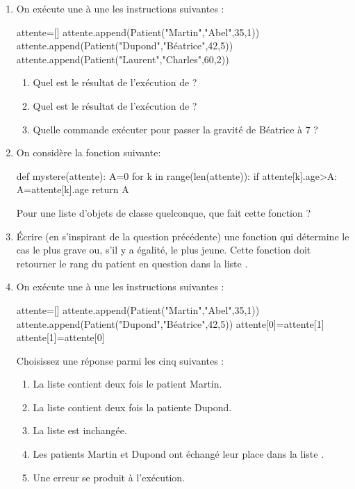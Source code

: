 \documentclass[11pt,a4paper,french,twoside]{PMCours}
\begin{document}
\begin{enumerate}
    \item On exécute une à une les instructions suivantes :
\begin{Python}
attente=[]
attente.append(Patient("Martin","Abel",35,1))
attente.append(Patient("Dupond","Béatrice",42,5))
attente.append(Patient("Laurent","Charles",60,2))
\end{Python}
\begin{enumerate}
    \item Quel est le résultat de l'exécution de  ?
    \item Quel est le résultat de l'exécution de  ?
    \item Quelle commande exécuter pour passer la gravité de Béatrice à $7$ ?
\end{enumerate}    
    \item On considère la fonction suivante:
\begin{Python}
def mystere(attente):
    A=0
    for k in range(len(attente)):
        if attente[k].age>A:
            A=attente[k].age
    return A
\end{Python}
    Pour une liste  d'objets de classe  quelconque,
    que fait cette fonction ?
    \item Écrire (en s'inspirant de la question précédente) une fonction  qui détermine
    le cas le plus grave ou, s'il y a égalité, le plus jeune.
    Cette fonction doit retourner le rang du patient en question dans la liste 
    .
    \item On exécute une à une les instructions suivantes :
\begin{Python}
attente=[]
attente.append(Patient("Martin","Abel",35,1))
attente.append(Patient("Dupond","Béatrice",42,5))
attente[0]=attente[1]
attente[1]=attente[0]
\end{Python}
    Choisissez une réponse parmi les cinq suivantes :
    \begin{enumerate}
        \item La liste  contient deux fois le patient Martin. 
        \item La liste  contient deux fois la patiente Dupond. 
        \item La liste  est inchangée. 
        \item Les patients Martin et Dupond ont échangé leur place dans la liste . 
        \item Une erreur se produit à l'exécution. 

\end{enumerate}
\end{enumerate}
\end{document}
